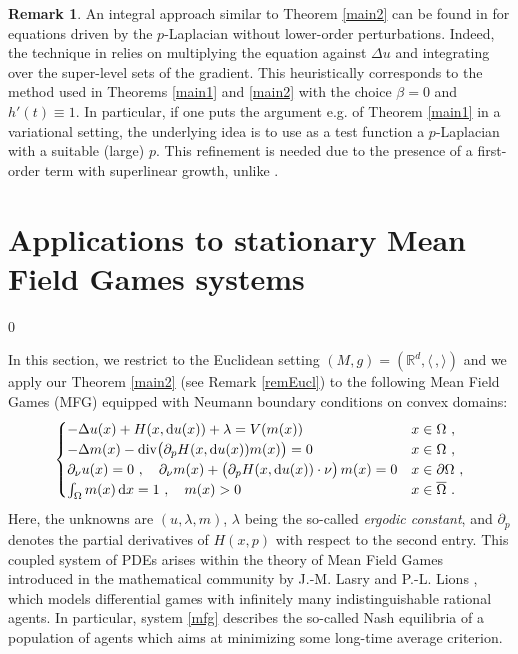 \documentclass[10pt, a4paper, reqno, oneside]{amsart}
\theoremstyle{plain}
\theoremstyle{definition}
\newtheorem{rem}[theo]{Remark}
\theoremstyle{plain}
\theoremstyle{definition}
\theoremstyle{plain}
\renewcommand{\=}{:=}
\begin{document}
\begin{rem}
An integral approach similar to Theorem \ref{main2} can be found in \cite{CM} for equations driven by the $p$-Laplacian without lower-order perturbations. Indeed, the technique in \cite{CM} relies on multiplying the equation against $\Delta u$ and integrating over the super-level sets of the gradient. This heuristically corresponds to the method used in Theorems \ref{main1} and \ref{main2} with the choice $\beta=0$ and $h'(t) \equiv 1$. In particular, if one puts the argument e.g. of Theorem \ref{main1} in a variational setting, the underlying idea is to use as a test function a $p$-Laplacian with a suitable (large) $p$. This refinement is needed due to the presence of a first-order term with superlinear growth, unlike \cite{CM}.
\end{rem}

\medskip
\section{Applications to stationary Mean Field Games systems} \label{sect_4}
\setcounter{equation} 0

In this section, we restrict to the Euclidean setting $(M,g)=(\mathbb{R}^d, \langle \, , \rangle)$ and we apply our Theorem \ref{main2} (see Remark \ref{remEucl}) to the following Mean Field Games (MFG) equipped with Neumann boundary conditions on convex domains:
\begin{equation} \label{mfg}
\begin{cases}
-\Delta u(x) +H(x,{\rm d}u(x))+\lambda=V(m(x)) & x \in \Omega \,\, , \\
-\Delta m(x) -\mathrm{div}\big(\partial_pH(x,{\rm d}u(x))m(x)\big)=0 & x \in \Omega \,\, , \\
\partial_\nu u (x) =0 \,\, , \quad \partial_\nu m(x) +\big(\partial_pH(x,{\rm d}u(x)) \cdot \nu\big)\,m(x) =0 & x \in \partial \Omega \,\, , \\
\int_\Omega m(x)\,{\rm d}x=1\ , \quad m(x)>0 & x \in \overline{\Omega} \,\, .
\end{cases}
\end{equation}
Here, the unknowns are $(u,\lambda,m)$, $\lambda$ being the so-called {\it ergodic constant}, and $\partial_{p}$ denotes the partial derivatives of $H(x,p)$ with respect to the second entry. This coupled system of PDEs arises within the theory of Mean Field Games introduced in the mathematical community by J.-M. Lasry and P.-L. Lions \cite{LL07}, which models differential games with infinitely many indistinguishable rational agents. In particular, system \eqref{mfg} describes the so-called Nash equilibria of a population of agents which aims at minimizing some long-time average criterion.
\end{document}
